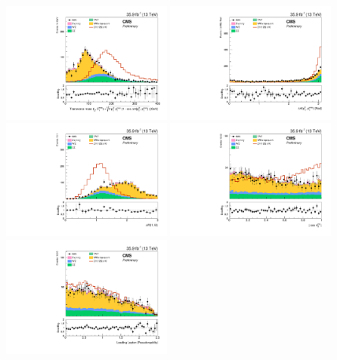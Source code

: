 \begin{figure}[htbp]
\begin{center}
\includegraphics[width=0.48\textwidth]{figures/mva_mTl2MET_nice.pdf}
\includegraphics[width=0.48\textwidth]{figures/mva_delphi_ptll_MET_nice.pdf}
\includegraphics[width=0.48\textwidth]{figures/mva_deltaR_ll_nice.pdf}
\includegraphics[width=0.48\textwidth]{figures/mva_abs_cos_theta_CS_l1_nice.pdf}
\includegraphics[width=0.48\textwidth]{figures/mva_abs_etal1_nice.pdf}

\end{center}
\end{figure}
